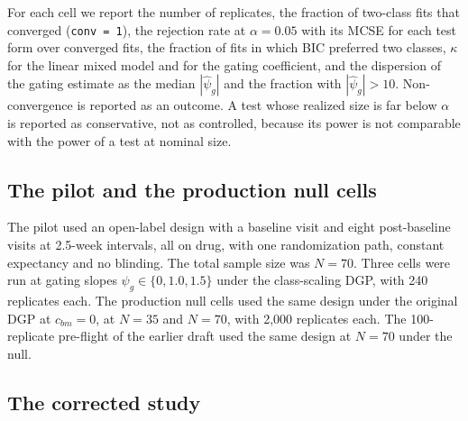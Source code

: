 \documentclass[
  11pt,
]{article}
\begin{document}
For each cell we report the number of replicates, the fraction of
two-class fits that converged (\texttt{conv\ =\ 1}), the rejection rate at
\(\alpha = 0.05\) with its MCSE for each test form over converged fits,
the fraction of fits in which BIC preferred two classes, \(\kappa\) for
the linear mixed model and for the gating coefficient, and the
dispersion of the gating estimate as the median \(|\hat\psi_g|\) and
the fraction with \(|\hat\psi_g| > 10\). Non-convergence is reported as
an outcome. A test whose realized size is far below \(\alpha\) is
reported as conservative, not as controlled, because its power is not
comparable with the power of a test at nominal size.

\subsection{The pilot and the production null cells}\label{the-pilot-and-the-production-null-cells}

The pilot used an open-label design with a baseline visit and eight
post-baseline visits at 2.5-week intervals, all on drug, with one
randomization path, constant expectancy and no blinding. The total
sample size was \(N = 70\). Three cells were run at gating slopes
\(\psi_g \in \{0, 1.0, 1.5\}\) under the class-scaling DGP, with 240
replicates each. The production null cells used the same design under
the original DGP at \(c_{bm} = 0\), at \(N = 35\) and \(N = 70\), with
2,000 replicates each. The 100-replicate pre-flight of the earlier
draft used the same design at \(N = 70\) under the null.

\subsection{The corrected study}\label{the-corrected-study}
\end{document}
